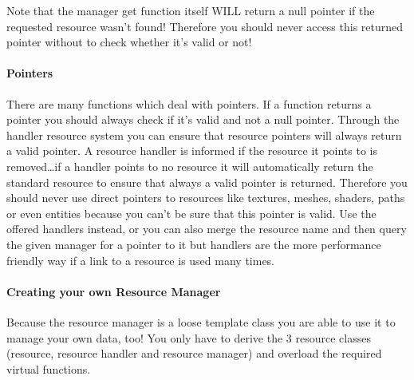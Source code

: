 Note that the manager get function itself WILL return a null pointer if the requested resource wasn't found! Therefore you should never access this returned pointer without to check whether it's valid or not!


\paragraph{Pointers}
There are many functions which deal with pointers. If a function returns a pointer you should always check if it's valid and not a null pointer. Through the handler resource system you can ensure that resource pointers will always return a valid pointer. A resource handler is informed if the resource it points to is removed\ldots if a handler points to no resource it will automatically return the standard resource to ensure that always a valid pointer is returned. Therefore you should never use direct pointers to resources like textures, meshes, shaders, paths or even entities because you can't be sure that this pointer is valid. Use the offered handlers instead, or you can also merge the resource name and then query the given manager for a pointer to it but handlers are the more performance friendly way if a link to a resource is used many times.


\paragraph{Creating your own Resource Manager}
Because the resource manager is a loose template class you are able to use it to manage your own data, too! You only have to derive the 3 resource classes (resource, resource handler and resource manager) and overload the required virtual functions.
